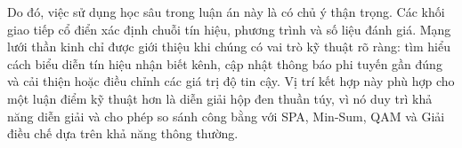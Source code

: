 Do đó, việc sử dụng học sâu trong luận án này là có chủ ý thận trọng. Các khối giao tiếp cổ điển xác định chuỗi tín hiệu, phương trình và số liệu đánh giá. Mạng lưới thần kinh chỉ được giới thiệu khi chúng có vai trò kỹ thuật rõ ràng: tìm hiểu cách biểu diễn tín hiệu nhận biết kênh, cập nhật thông báo phi tuyến gần đúng và cải thiện hoặc điều chỉnh các giá trị độ tin cậy. Vị trí kết hợp này phù hợp cho một luận điểm kỹ thuật hơn là diễn giải hộp đen thuần túy, vì nó duy trì khả năng diễn giải và cho phép so sánh công bằng với SPA, Min-Sum, QAM và Giải điều chế dựa trên khả năng thông thường.
